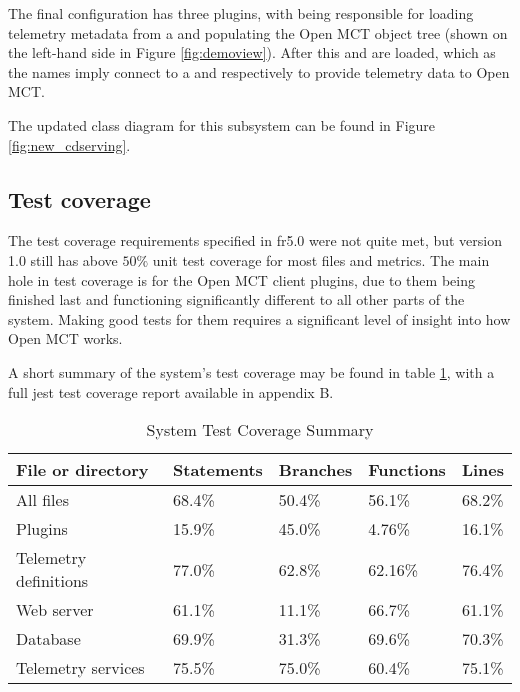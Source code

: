The final configuration has three plugins, with  being responsible for loading telemetry metadata from a  and populating the Open MCT object tree (shown on the left-hand side in Figure \ref{fig:demoview}). After this  and  are loaded, which as the names imply connect to a  and  respectively to provide telemetry data to Open MCT.

The updated class diagram for this subsystem can be found in Figure \ref{fig:new_cdserving}.

\subsection{Test coverage}
The test coverage requirements specified in \acrshort{fr}5.0 were not quite met, but version 1.0 still has above $50\%$ unit test coverage for most files and metrics. The main hole in test coverage is for the Open MCT client plugins, due to them being finished last and functioning significantly different to all other parts of the system. Making good tests for them requires a significant level of insight into how Open MCT works.

A short summary of the system's test coverage may be found in table \ref{tab:tests}, with a full \Gls{jest} test coverage report available in appendix B.

\begin{table}[ht]
\centering
\caption{System Test Coverage Summary}
\label{tab:tests}
\begin{tabular}{|l|l|l|l|l|}
\hline
\rowcolor[HTML]{C0C0C0} 
File or directory     & Statements & Branches & Functions & Lines  \\ \hline
All files             & 68.4\%     & 50.4\%   & 56.1\%    & 68.2\% \\ \hline
Plugins               & 15.9\%     & 45.0\%   & 4.76\%    & 16.1\% \\ \hline
Telemetry definitions & 77.0\%     & 62.8\%   & 62.16\%   & 76.4\% \\ \hline
Web server            & 61.1\%     & 11.1\%   & 66.7\%    & 61.1\% \\ \hline
Database              & 69.9\%     & 31.3\%   & 69.6\%    & 70.3\% \\ \hline
Telemetry services    & 75.5\%     & 75.0\%   & 60.4\%    & 75.1\% \\ \hline
\end{tabular}
\end{table}

